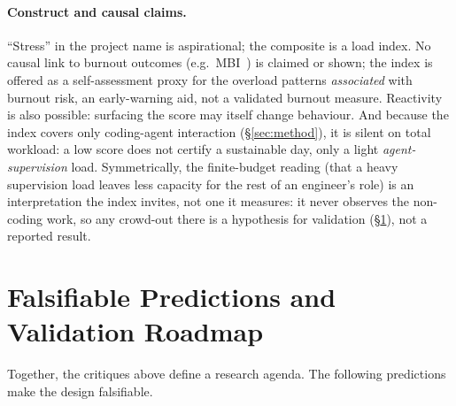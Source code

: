 \documentclass[10pt,twocolumn]{article}
\begin{document}
\paragraph{Construct and causal claims.} ``Stress'' in the project name is
aspirational; the composite is a load index. No causal link to burnout outcomes
(e.g.\ MBI~\cite{maslach1981}) is claimed or shown; the index is offered as a
self-assessment proxy for the overload patterns \emph{associated} with burnout
risk, an early-warning aid, not a validated burnout measure. Reactivity is also
possible: surfacing the score may itself change behaviour. And because the index
covers only coding-agent interaction (\S\ref{sec:method}), it is silent on total
workload: a low score does not certify a sustainable day, only a light
\emph{agent-supervision} load. Symmetrically, the finite-budget reading (that a
heavy supervision load leaves less capacity for the rest of an engineer's
role) is an interpretation the index invites, not one it measures: it never
observes the non-coding work, so any crowd-out there is a hypothesis for
validation (\S\ref{sec:validation}), not a reported result.

\section{Falsifiable Predictions and Validation Roadmap}\label{sec:validation}
Together, the critiques above define a research agenda. The following predictions
make the design falsifiable.
\end{document}
